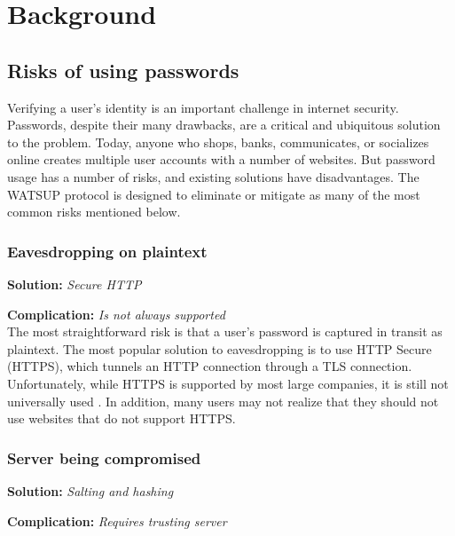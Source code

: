 \section{Background}
\label{sec:background}

\subsection{Risks of using passwords}

Verifying a user's identity is an important challenge in internet security. Passwords, despite their many drawbacks, are a critical and ubiquitous solution to the problem. Today, anyone who shops, banks, communicates, or socializes online creates multiple user accounts with a number of websites. But password usage has a number of risks, and existing solutions have disadvantages. The WATSUP protocol is designed to eliminate or mitigate as many of the most common risks mentioned below.


\subsubsection{Eavesdropping on plaintext}

\textbf{Solution:} \emph{Secure HTTP}

\noindent\textbf{Complication:} \emph{Is not always supported}\\

\noindent The most straightforward risk is that a user's password is captured in transit as plaintext. The most popular solution to eavesdropping is to use HTTP Secure (HTTPS), which tunnels an HTTP connection through a TLS connection. Unfortunately, while HTTPS is supported by most large companies, it is still not universally used \cite{letsencrypt:2016}. In addition, many users may not realize that they should not use websites that do not support HTTPS.


\subsubsection{Server being compromised}

\textbf{Solution:} \emph{Salting and hashing}

\noindent\textbf{Complication:} \emph{Requires trusting server}\\

